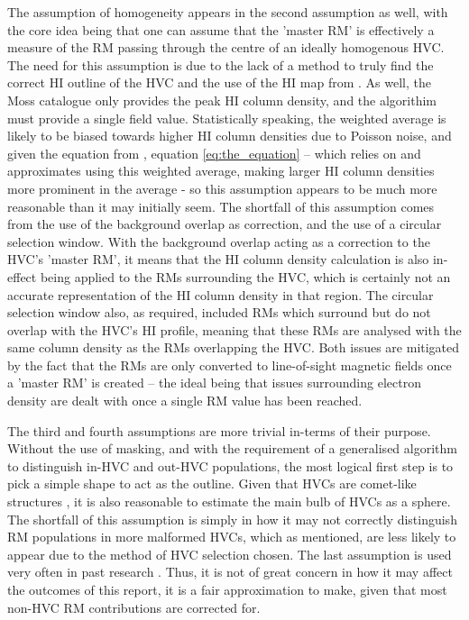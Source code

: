 The assumption of homogeneity appears in the second assumption as well, with the core idea being that one can assume that the 'master RM' is effectively a measure of the RM passing through the centre of an ideally homogenous HVC. The need for this assumption is due to the lack of a method to truly find the correct HI outline of the HVC and the use of the HI map from \cite{ID6}. As well, the Moss catalogue only provides the peak HI column density, and the algorithim must provide a single field value.  Statistically speaking, the weighted average is likely to be biased towards higher HI column densities due to Poisson noise, and given the equation from \cite{ID27}, equation \ref{eq:the_equation} – which relies on and approximates using this weighted average, making larger HI column densities more prominent in the average - so this assumption appears to be much more reasonable than it may initially seem. The shortfall of this assumption comes from the use of the background overlap as correction, and the use of a circular selection window. With the background overlap acting as a correction to the HVC's 'master RM', it means that the HI column density calculation is also in-effect being applied to the RMs surrounding the HVC, which is certainly not an accurate representation of the HI column density in that region. The circular selection window also, as required, included RMs which surround but do not overlap with the HVC's HI profile, meaning that these RMs are analysed with the same column density as the RMs overlapping the HVC. Both issues are mitigated by the fact that the RMs are only converted to line-of-sight magnetic fields once a 'master RM' is created – the ideal being that issues surrounding electron density are dealt with once a single RM value has been reached.


The third and fourth assumptions are more trivial in-terms of their purpose. Without the use of masking, and with the requirement of a generalised algorithm to distinguish in-HVC and out-HVC populations, the most logical first step is to pick a simple shape to act as the outline. Given that HVCs are comet-like structures \citep{ID13}, it is also reasonable to estimate the main bulb of HVCs as a sphere. The shortfall of this assumption is simply in how it may not correctly distinguish RM populations in more malformed HVCs, which as mentioned, are less likely to appear due to the method of HVC selection chosen. The last assumption is used very often in past research \citep{ID27,ID3, ID26, ID5}. Thus, it is not of great concern in how it may affect the outcomes of this report, it is a fair approximation to make, given that most non-HVC RM contributions are corrected for.


